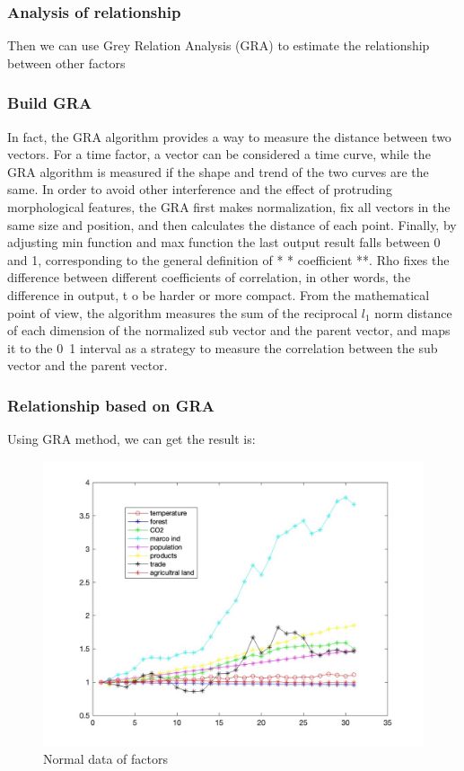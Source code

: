 \documentclass{apmcmthesis}
\begin{document}
\subsubsection{Analysis of relationship}
Then we can use Grey Relation Analysis (GRA) to estimate the relationship between other factors

\subsubsection{Build GRA}

In fact, the GRA algorithm provides a way to measure the distance between two vectors. 
For a time factor, a vector can be considered a time curve, while the GRA algorithm is measured if the shape and trend of the two curves are the same. 
In order to avoid other interference and the effect of protruding morphological features, the GRA first makes normalization, 
fix all vectors in the same size and position, and then calculates the distance of each point. 
Finally, by adjusting min function and max function the last output result falls between 0 and 1, corresponding to the general definition of * * coefficient **. 
Rho fixes the difference between different coefficients of correlation, in other words, the difference in output, t o be harder or more compact. 
From the mathematical point of view, the algorithm measures the sum of the reciprocal $l_1$ norm distance of each dimension of the normalized sub vector and the parent vector, 
and maps it to the 0~1 interval as a strategy to measure the correlation between the sub vector and the parent vector.

\subsubsection{Relationship based on GRA}
Using GRA method, we can get the result is:
\begin{figure}[htbp]
  \centering
  \includegraphics[scale=0.25]{2c1.jpg}
  \caption{Normal data of factors}
\end{figure}
\end{document}
